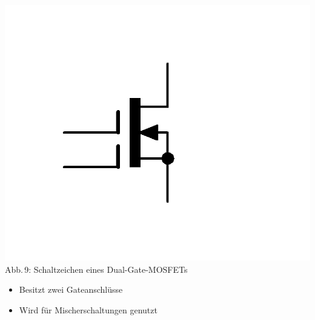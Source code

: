 \begin{frame}
  \begin{center}
    \includegraphics[width=\textwidth,height=.6\textheight,keepaspectratio]{a06/Dual-Gate-MOSFET.png}\\
    {\tiny Abb.\,9: Schaltzeichen eines Dual-Gate-MOSFETs}
  \end{center}
  \begin{itemize}
    \item Besitzt zwei Gateanschlüsse
    \item Wird für Mischerschaltungen genutzt
  \end{itemize}
\end{frame}


